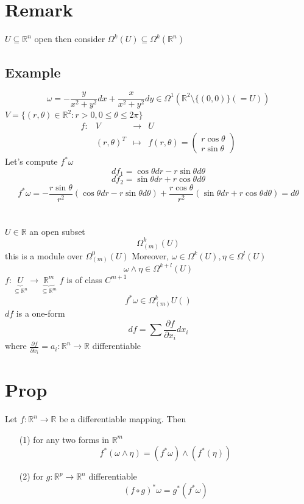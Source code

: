 \documentclass{book}
\begin{document}
\section{Remark}
$U\subseteq\mathbb{R}^n$ open then consider $\Omega^k(U)\subseteq \Omega^k(\mathbb{R}^n)$
\subsection*{Example}$$
\omega=-\frac{y}{x^2+y^2}dx+\frac{x}{x^2+y^2}dy\in \Omega^1(\mathbb{R}^2\setminus\{(0,0)\}(=U))$$
$V=\{(r,\theta)\in \mathbb{R}^2:r>0,0\leq\theta\leq 2\pi\}$
$$\begin{aligned}
    f: &V&\rightarrow &U\\
    &(r,\theta)^T&\mapsto &f(r,\theta)=\begin{pmatrix}
        r\cos\theta\\r\sin\theta
    \end{pmatrix}
\end{aligned}$$
Let's compute $f^*\omega$
$$df_1=\cos\theta dr-r\sin\theta d\theta$$
$$df_2=\sin\theta dr+r\cos\theta d\theta$$
$$f^*\omega=-\frac{r\sin\theta}{r^2}(\cos\theta dr-r\sin\theta d\theta)+\frac{r\cos\theta}{r^2}(\sin\theta dr+r\cos\theta d\theta)=d\theta$$
















\section{}
$U\in \mathbb{R}$ an open subset
$$\Omega_{(m)}^k(U)$$
this is a module over $\Omega^0_{(m)}(U)$ 
Moreover, $\omega\in \Omega^k(U),\eta\in \Omega^l(U)$
$$\omega\wedge\eta\in \Omega^{k+l}(U)$$
$f:\underbrace{U}\limits_{\subseteq\mathbb{R}^n}\rightarrow \underbrace{\mathbb{R}^m}\limits_{\subseteq\mathbb{R}^m}$
$f$ is of class $C^{m+1}$
$$f^*\omega\in \Omega_{(m)}^kU()$$
$df$ is a one-form$$df=\sum\frac{\partial f}{\partial x_i}dx_i$$
where $\frac{\partial f}{\partial x_i}=a_i:\mathbb{R}^n\rightarrow\mathbb{R}$ differentiable
\section{Prop}
Let $f:\mathbb{R}^n\rightarrow\mathbb{R}$ be a differentiable mapping. Then
\begin{itemize}
    \item [(1)]for any two forms in $\mathbb{R}^m$$$f^*(\omega\wedge\eta)=(f^*\omega)\wedge(f^*(\eta))$$
    \item [(2)]for $g:\mathbb{R}^p\rightarrow\mathbb{R}^n$ differentiable$$(f\circ g)^*\omega=g^*(f^*\omega)$$
\end{itemize}
\end{document}

